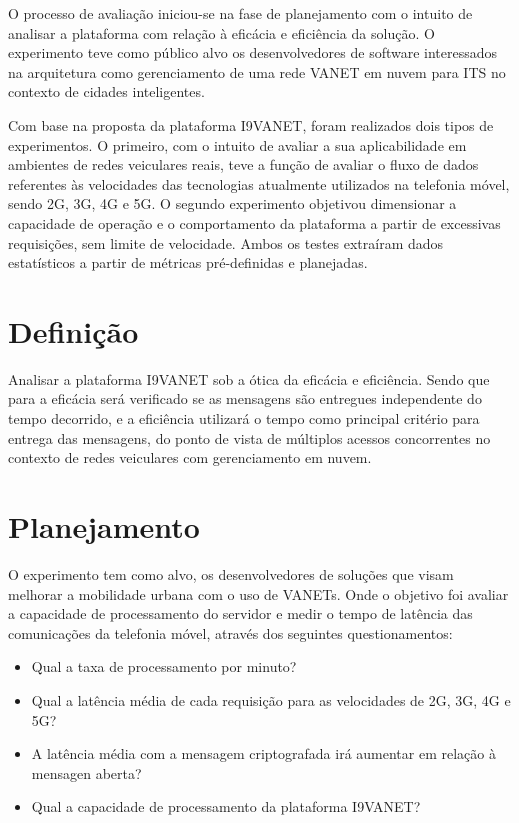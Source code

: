 \documentclass[
	12pt,				%
	oneside,			%
	a4paper,			%
	english,			%
	brazil				%
	]{abntex2ppgsi}
\begin{document}
O processo de avaliação iniciou-se na fase de planejamento com o intuito de analisar a plataforma com relação à eficácia e eficiência da solução. O experimento teve como público alvo os desenvolvedores de software interessados na arquitetura como gerenciamento de uma rede VANET em nuvem para ITS no contexto de cidades inteligentes.

Com base na proposta da plataforma I9VANET, foram realizados dois tipos de experimentos. O primeiro, com o intuito de avaliar a sua aplicabilidade em ambientes de redes veiculares reais, teve a função de avaliar o fluxo de dados referentes às velocidades das tecnologias atualmente utilizados na telefonia móvel, sendo 2G, 3G, 4G e 5G. O segundo experimento objetivou dimensionar a capacidade de operação e o comportamento da plataforma a partir de excessivas requisições, sem limite de velocidade. Ambos os testes extraíram dados estatísticos a partir de métricas pré-definidas e planejadas.

\section{Definição}

Analisar a plataforma I9VANET  sob a ótica da eficácia e eficiência. Sendo que para a eficácia será verificado se as mensagens são entregues independente do tempo decorrido, e a eficiência utilizará o tempo como principal critério para entrega das mensagens, do ponto de vista de múltiplos acessos concorrentes no contexto de redes veiculares com gerenciamento em nuvem. 


\section{Planejamento}
O experimento tem como alvo, os desenvolvedores de soluções que visam melhorar a mobilidade urbana com o uso de VANETs. Onde o objetivo foi avaliar a capacidade de processamento do servidor e medir o tempo de latência das comunicações da telefonia móvel, através dos seguintes questionamentos:
\begin{itemize}
	\item {Qual a taxa de processamento por minuto?}
	\item {Qual a latência média de cada requisição para as velocidades de 2G, 3G, 4G e 5G?}
	\item {A latência média com a mensagem criptografada irá aumentar em relação à mensagen aberta?}
	\item {Qual a capacidade de processamento da plataforma I9VANET?}
\end{itemize} 
\end{document}
